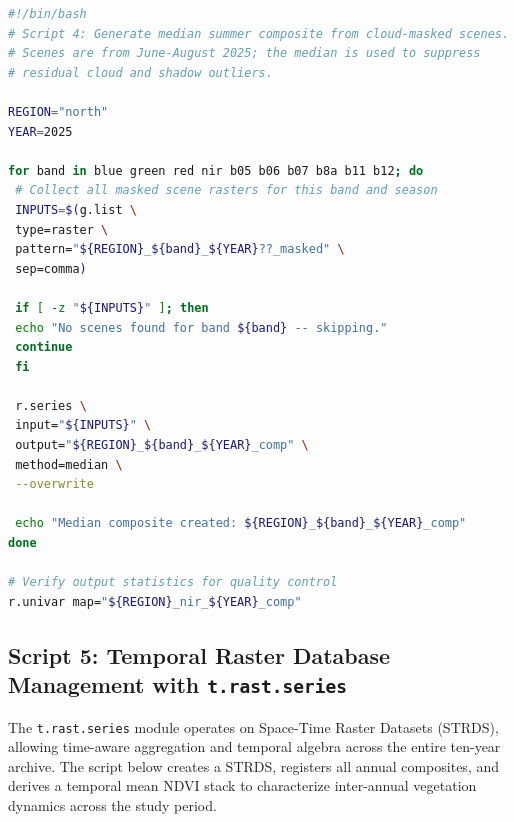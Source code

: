 \documentclass[coasts,article,accept,pdftex,moreauthors]{Definitions/mdpi}
\begin{document}
\begin{lstlisting}[language=bash,caption={Median summer compositing of Sentinel-2 scenes using \texttt{r.series}.}, label={lst:rseries},xleftmargin=11pt,xrightmargin=3.5pt]
#!/bin/bash
# Script 4: Generate median summer composite from cloud-masked scenes.
# Scenes are from June-August 2025; the median is used to suppress
# residual cloud and shadow outliers.

REGION="north"
YEAR=2025

for band in blue green red nir b05 b06 b07 b8a b11 b12; do
 # Collect all masked scene rasters for this band and season
 INPUTS=$(g.list \
 type=raster \
 pattern="${REGION}_${band}_${YEAR}??_masked" \
 sep=comma)

 if [ -z "${INPUTS}" ]; then
 echo "No scenes found for band ${band} -- skipping."
 continue
 fi

 r.series \
 input="${INPUTS}" \
 output="${REGION}_${band}_${YEAR}_comp" \
 method=median \
 --overwrite

 echo "Median composite created: ${REGION}_${band}_${YEAR}_comp"
done

# Verify output statistics for quality control
r.univar map="${REGION}_nir_${YEAR}_comp"
\end{lstlisting}

\subsection{Script 5: Temporal Raster Database Management with \texttt{t.rast.series}}

The \texttt{t.rast.series} module operates on Space-Time Raster Datasets (STRDS), allowing time-aware aggregation and temporal algebra across the entire ten-year archive. The script below creates a STRDS, registers all annual composites, and derives a temporal mean NDVI stack to characterize inter-annual vegetation dynamics across the study period.
\end{document}
